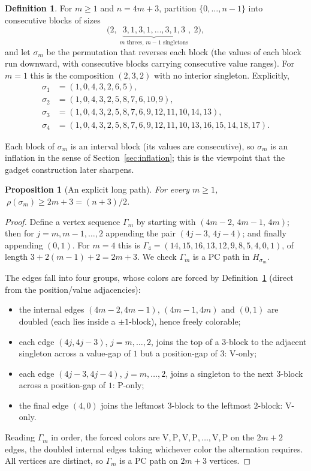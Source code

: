 \documentclass[11pt]{article}
\newtheorem{proposition}[theorem]{Proposition}
\theoremstyle{definition}
\newtheorem{definition}[theorem]{Definition}
\begin{document}
\begin{definition}\label{def:sigmam}
For $m\ge1$ and $n=4m+3$, partition $\{0,\dots,n-1\}$ into consecutive blocks of sizes
\[
  \bigl(2,\ \underbrace{3,1,3,1,\dots,3,1,3}_{m\text{ threes, }m-1\text{ singletons}},\
  2\bigr),
\]
and let $\sigma_m$ be the permutation that reverses each block (the values of each
block run downward, with consecutive blocks carrying consecutive value ranges). For
$m=1$ this is the composition $(2,3,2)$ with no interior singleton. Explicitly,
\[
\begin{aligned}
\sigma_1 &= (1,0,4,3,2,6,5),\\
\sigma_2 &= (1,0,4,3,2,5,8,7,6,10,9),\\
\sigma_3 &= (1,0,4,3,2,5,8,7,6,9,12,11,10,14,13),\\
\sigma_4 &= (1,0,4,3,2,5,8,7,6,9,12,11,10,13,16,15,14,18,17).
\end{aligned}
\]
\end{definition}

Each block of $\sigma_m$ is an interval block (its values are consecutive), so
$\sigma_m$ is an inflation in the sense of Section~\ref{sec:inflation}; this is the
viewpoint that the gadget construction later sharpens.

\begin{proposition}[An explicit long path]\label{prop:sigmam-lower}
For every $m\ge1$, $\ \rho(\sigma_m)\ge2m+3=(n+3)/2$.
\end{proposition}

\begin{proof}
Define a vertex sequence $\Gamma_m$ by starting with $(4m-2,\,4m-1,\,4m)$; then for
$j=m,m-1,\dots,2$ appending the pair $(4j-3,\,4j-4)$; and finally appending $(0,1)$.
For $m=4$ this is $\Gamma_4=(14,15,16,13,12,9,8,5,4,0,1)$, of length
$3+2(m-1)+2=2m+3$. We check $\Gamma_m$ is a PC path in $H_{\sigma_m}$.

The edges fall into four groups, whose colors are forced by Definition~\ref{def:sigmam}
(direct from the position/value adjacencies):
\begin{itemize}
\item the internal edges $(4m-2,4m-1)$, $(4m-1,4m)$ and $(0,1)$ are doubled (each lies
inside a $\pm1$-block), hence freely colorable;
\item each edge $(4j,4j-3)$, $j=m,\dots,2$, joins the top of a $3$-block to the
adjacent singleton across a value-gap of $1$ but a position-gap of $3$: V-only;
\item each edge $(4j-3,4j-4)$, $j=m,\dots,2$, joins a singleton to the next $3$-block
across a position-gap of $1$: P-only;
\item the final edge $(4,0)$ joins the leftmost $3$-block to the leftmost $2$-block:
V-only.
\end{itemize}
Reading $\Gamma_m$ in order, the forced colors are
$\mathrm{V},\mathrm{P},\mathrm{V},\mathrm{P},\dots,\mathrm{V},\mathrm{P}$ on the
$2m+2$ edges, the doubled internal edges taking whichever color the alternation
requires. All vertices are distinct, so $\Gamma_m$ is a PC path on $2m+3$ vertices.
\end{proof}
\end{document}
